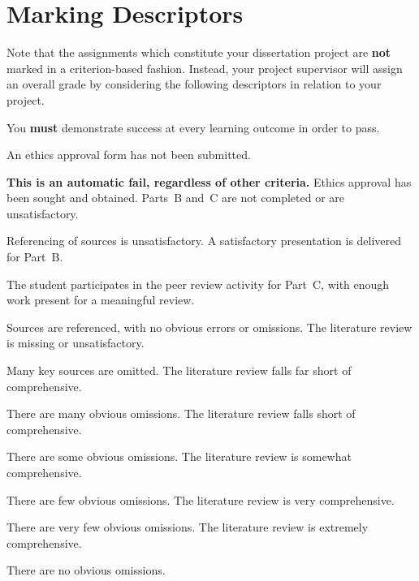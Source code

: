 \chapter{Marking Descriptors}

Note that the assignments which constitute your dissertation project are \textbf{not} marked in a criterion-based fashion.
Instead, your project supervisor will assign an overall grade by considering the following descriptors in relation to your project.

You \textbf{must} demonstrate success at every learning outcome in order to pass.


\begin{markingrubric}
		\grade\fail An ethics approval form has not been submitted.
			\par \textbf{This is an automatic fail, regardless of other criteria.}
		\grade Ethics approval has been sought and obtained.
		\grade\fail Parts~B and~C are not completed or are unsatisfactory.
			\par Referencing of sources is unsatisfactory.
		\grade A satisfactory presentation is delivered for Part~B.
			\par The student participates in the peer review activity for Part~C, with enough work present for a meaningful review.
			\par Sources are referenced, with no obvious errors or omissions.
        \grade \fail 	The literature review is missing or unsatisfactory.
        	\par 		Many key sources are omitted.
        \grade 		The literature review falls far short of comprehensive.
        	\par 		There are many obvious omissions.
        \grade		The literature review falls short of comprehensive.
        	\par 		There are some obvious omissions.
        \grade 		The literature review is somewhat comprehensive.
        	\par 		There are few obvious omissions.
        \grade		The literature review is very comprehensive.
        	\par 		There are very few obvious omissions.
        \grade		The literature review is extremely comprehensive.
        	\par 		There are no obvious omissions.

\end{markingrubric}
